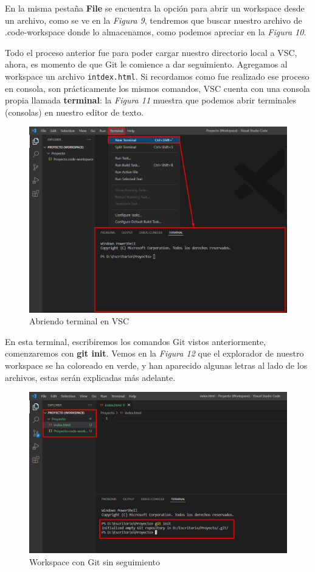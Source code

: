 En la misma pestaña \textbf{File} se encuentra la opción para abrir un workspace desde un archivo, como se ve en la \textit{Figura 9}, tendremos que buscar nuestro archivo de .code-workspace donde lo almacenamos, como podemos apreciar en la \textit{Figura 10}.

Todo el proceso anterior fue para poder cargar nuestro directorio local a VSC, ahora, es momento de que Git le comience a dar seguimiento. Agregamos al workspace un archivo \texttt{intdex.html}. Si recordamos como fue realizado ese proceso en consola, son prácticamente los mismos comandos, VSC cuenta con una consola propia llamada \textbf{terminal}: la \textit{Figura 11} muestra que podemos abrir terminales (consolas) en nuestro editor de texto.
\begin{figure}[H]
    \begin{center}
        \caption{Abriendo terminal en VSC}
        \label{fig: 11}
        \includegraphics[width=12cm]{capturas/abriendo_terminal.png}
    \end{center}
\end{figure}

En esta terminal, escribiremos los comandos Git vistos anteriormente, comenzaremos con \textbf{git init}. Vemos en la \textit{Figura 12} que el explorador de nuestro workspace se ha coloreado en verde, y han aparecido algunas letras al lado de los archivos, estas serán explicadas más adelante.
\begin{figure}[H]
    \begin{center}
        \caption{Workspace con Git sin seguimiento}
        \label{fig: 12}
        \includegraphics[width=12cm]{capturas/git init.png}
    \end{center}
\end{figure}

